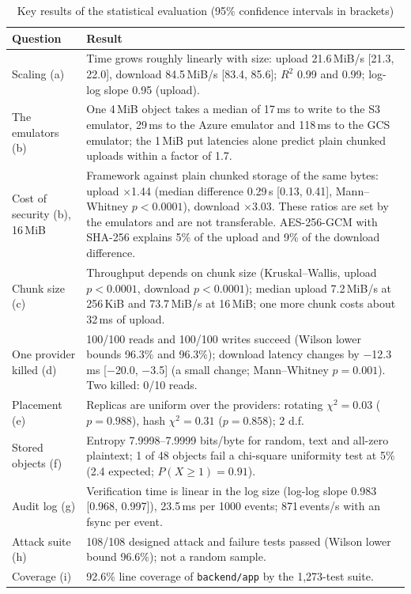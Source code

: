 \documentclass[conference]{IEEEtran}
\newcommand{\code}[1]{\texttt{\small #1}}
\begin{document}
\begin{table}[t]
\caption{Key results of the statistical evaluation (95\% confidence intervals in brackets)}
\label{tab:stats}
\centering
\footnotesize
\begin{tabularx}{\columnwidth}{@{}>{\raggedright\arraybackslash}p{2.35cm}L@{}}
\toprule
Question & Result \\
\midrule
Scaling (a) & Time grows roughly linearly with size: upload 21.6\,MiB/s [21.3, 22.0], download 84.5\,MiB/s [83.4, 85.6]; $R^2$ 0.99 and 0.99; log-log slope 0.95 (upload). \\
The emulators (b) & One 4\,MiB object takes a median of 17\,ms to write to the S3 emulator, 29\,ms to the Azure emulator and 118\,ms to the GCS emulator; the 1\,MiB put latencies alone predict plain chunked uploads within a factor of 1.7. \\
Cost of security (b), 16\,MiB & Framework against plain chunked storage of the same bytes: upload $\times$1.44 (median difference 0.29\,s [0.13, 0.41], Mann--Whitney $p<0.0001$), download $\times$3.03. These ratios are set by the emulators and are not transferable. AES-256-GCM with SHA-256 explains 5\% of the upload and 9\% of the download difference. \\
Chunk size (c) & Throughput depends on chunk size (Kruskal--Wallis, upload $p<0.0001$, download $p<0.0001$); median upload 7.2\,MiB/s at 256\,KiB and 73.7\,MiB/s at 16\,MiB; one more chunk costs about 32\,ms of upload. \\
One provider killed (d) & 100/100 reads and 100/100 writes succeed (Wilson lower bounds 96.3\% and 96.3\%); download latency changes by $-$12.3\,ms [$-$20.0, $-$3.5] (a small change; Mann--Whitney $p=0.001$). Two killed: 0/10 reads. \\
Placement (e) & Replicas are uniform over the providers: rotating $\chi^2=0.03$ ($p=0.988$), hash $\chi^2=0.31$ ($p=0.858$); 2 d.f. \\
Stored objects (f) & Entropy 7.9998--7.9999 bits/byte for random, text and all-zero plaintext; 1 of 48 objects fail a chi-square uniformity test at 5\% (2.4 expected; $P(X\ge1)=0.91$). \\
Audit log (g) & Verification time is linear in the log size (log-log slope 0.983 [0.968, 0.997]), 23.5\,ms per 1000 events; 871\,events/s with an fsync per event. \\
Attack suite (h) & 108/108 designed attack and failure tests passed (Wilson lower bound 96.6\%); not a random sample. \\
Coverage (i) & 92.6\% line coverage of \code{backend/app} by the 1,273-test suite. \\
\bottomrule
\end{tabularx}
\end{table}
\end{document}
